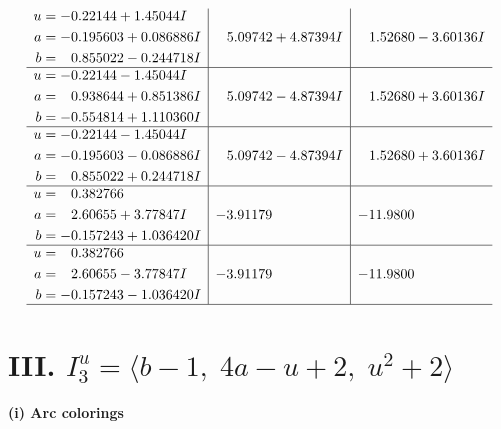 \documentclass[1p]{elsarticle_modified}
\theoremstyle{definition}
\begin{document}
$$\begin{array}{c|c|c}
\begin{aligned}
u &= -0.22144 + 1.45044 I \\
a &= -0.195603 + 0.086886 I \\
b &= \phantom{-}0.855022 - 0.244718 I\end{aligned}
 & \phantom{-}5.09742 + 4.87394 I & \phantom{-}1.52680 - 3.60136 I \\ \hline\begin{aligned}
u &= -0.22144 - 1.45044 I \\
a &= \phantom{-}0.938644 + 0.851386 I \\
b &= -0.554814 + 1.110360 I\end{aligned}
 & \phantom{-}5.09742 - 4.87394 I & \phantom{-}1.52680 + 3.60136 I \\ \hline\begin{aligned}
u &= -0.22144 - 1.45044 I \\
a &= -0.195603 - 0.086886 I \\
b &= \phantom{-}0.855022 + 0.244718 I\end{aligned}
 & \phantom{-}5.09742 - 4.87394 I & \phantom{-}1.52680 + 3.60136 I \\ \hline\begin{aligned}
u &= \phantom{-}0.382766\phantom{ +0.000000I} \\
a &= \phantom{-}2.60655 + 3.77847 I \\
b &= -0.157243 + 1.036420 I\end{aligned}
 & -3.91179\phantom{ +0.000000I} & -11.9800\phantom{ +0.000000I} \\ \hline\begin{aligned}
u &= \phantom{-}0.382766\phantom{ +0.000000I} \\
a &= \phantom{-}2.60655 - 3.77847 I \\
b &= -0.157243 - 1.036420 I\end{aligned}
 & -3.91179\phantom{ +0.000000I} & -11.9800\phantom{ +0.000000I}\\
 \hline 
 \end{array}$$\newpage\newpage\renewcommand{\arraystretch}{1}
\centering \section*{III. $I^u_{3}= \langle b-1,\;4 a- u+2,\;u^2+2 \rangle$}
\flushleft \textbf{(i) Arc colorings}\\
\end{document}
